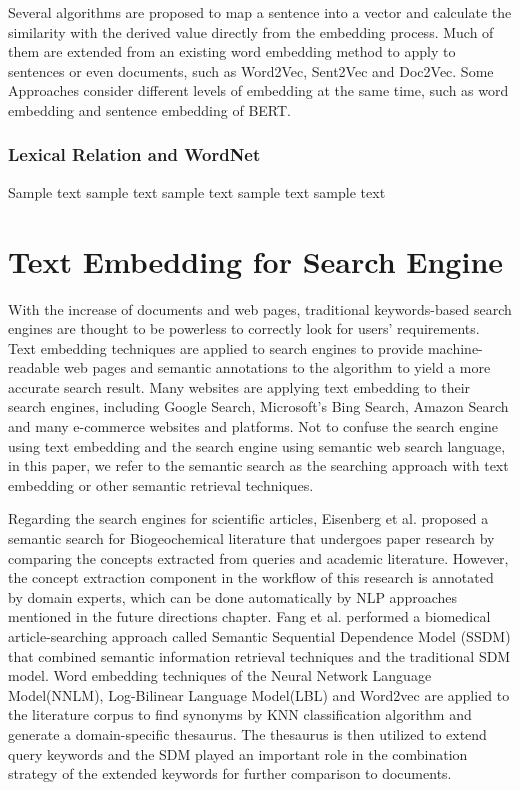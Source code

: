 Several algorithms are proposed to map a sentence into a vector and calculate the similarity with the derived value directly from the embedding process.
Much of them are extended from an existing word embedding method to apply to sentences or even documents, such as Word2Vec, Sent2Vec and Doc2Vec.
Some Approaches consider different levels of embedding at the same time, such as word embedding and sentence embedding of BERT.

\subsubsection{Lexical Relation and WordNet}
Sample text sample text sample text sample text sample text


\section{Text Embedding for Search Engine}
With the increase of documents and web pages, traditional keywords-based search engines are thought to be powerless to correctly look for users' requirements.
Text embedding techniques are applied to search engines to provide machine-readable web pages and semantic annotations to the algorithm to yield a more accurate search result.
Many websites are applying text embedding to their search engines, including Google Search, Microsoft's Bing Search, Amazon Search and many e-commerce websites and platforms.
Not to confuse the search engine using text embedding and the search engine using semantic web search language, in this paper, we refer to the semantic search as the searching approach with text embedding or other semantic retrieval techniques. 

Regarding the search engines for scientific articles, Eisenberg et al.\cite{eisenberg2017} proposed a semantic search for Biogeochemical literature that undergoes paper research by comparing the concepts extracted from queries and academic literature.
However, the concept extraction component in the workflow of this research is annotated by domain experts, which can be done automatically by NLP approaches mentioned in the future directions chapter.
Fang et al.\cite{fang2018} performed a biomedical article-searching approach called Semantic Sequential Dependence Model (SSDM) that combined semantic information retrieval techniques and the traditional SDM model.
Word embedding techniques of the Neural Network Language Model(NNLM)\cite{bengio2000}, Log-Bilinear Language Model(LBL)\cite{mnih2007} and Word2vec are applied to the literature corpus to find synonyms by KNN classification algorithm and generate a domain-specific thesaurus.
The thesaurus is then utilized to extend query keywords and the SDM played an important role in the combination strategy of the extended keywords for further comparison to documents.

